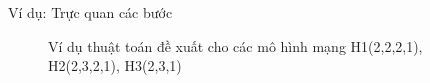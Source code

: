 	\begin{frame}{Ví dụ: Trực quan các bước}
		\begin{figure}[h!] 
            \centering
            \caption{Ví dụ thuật toán đề xuất cho các mô hình mạng H1(2,2,2,1), H2(2,3,2,1), H3(2,3,1)}
            \label{fig:problem:modular-ex1}
        \end{figure}
	\end{frame}
